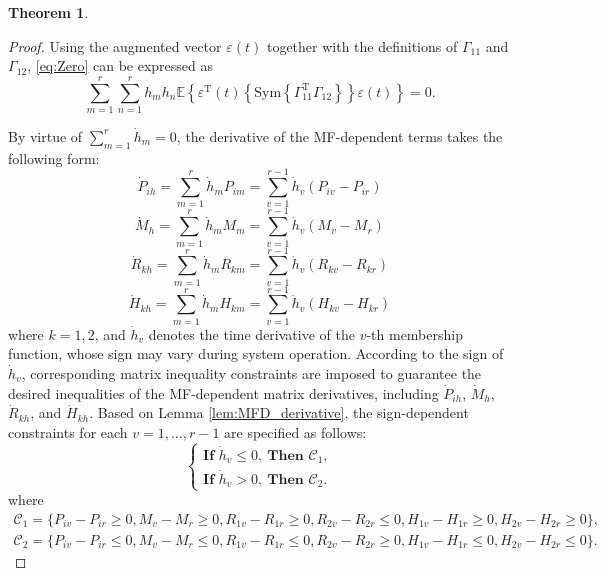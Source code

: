\documentclass[preprint,review,fleqn,sort&compress,3p]{elsarticle}
\theoremstyle{definition} %
\theoremstyle{definition}%
\newtheorem{thm}{Theorem}[section]
\begin{document}
\begin{thm}
\begin{proof}
			Using the augmented vector $\varepsilon(t)$ together with the definitions of $\Gamma_{11}$ and $\Gamma_{12}$, \eqref{eq:Zero} can be expressed as
			\begin{equation} \label{eq:compact_VEQ}
				\sum_{m=1}^{r} \sum_{n=1}^{r} h_m h_n
				\mathbb{E} \left\lbrace 
				\varepsilon^{\mathrm{T}}(t) 
				\left\lbrace 
				\mathrm{Sym} \left\{ 
				\Gamma_{11}^{\mathrm{T}} \Gamma_{12}
				\right\} 
				\right\rbrace 
				\varepsilon(t)
				\right\rbrace 
				= 0.
			\end{equation}
			
			By virtue of $\sum_{m=1}^{r}\dot{h}_m=0$, the derivative of the MF-dependent terms takes the following form:
			\begin{equation}
				\dot{P}_{ih} = \sum_{m=1}^{r} \dot{h}_m P_{im} = \sum_{v=1}^{r-1} \dot{h}_v (P_{iv} - P_{ir})
			\end{equation}
			\begin{equation}
				\dot{M}_{h} = \sum_{m=1}^{r} \dot{h}_m M_{m} = \sum_{v=1}^{r-1} \dot{h}_v (M_{v} - M_{r})
			\end{equation}
			\begin{equation}
				\dot{R}_{kh} = \sum_{m=1}^{r} \dot{h}_m R_{km} = \sum_{v=1}^{r-1} \dot{h}_v (R_{kv} - R_{kr})
			\end{equation}
			\begin{equation}
				\dot{H}_{kh} = \sum_{m=1}^{r} \dot{h}_m H_{km} = \sum_{v=1}^{r-1} \dot{h}_v (H_{kv} - H_{kr})
			\end{equation}
			where $k = 1, 2$, and $\dot{h}_v$ denotes the time derivative of the $v$-th membership function, whose sign may vary during system operation. According to the sign of $\dot{h}_v$, corresponding matrix inequality constraints are imposed to guarantee the desired inequalities of the MF-dependent matrix derivatives, including $\dot P_{ih}$, $\dot M_h$, $\dot R_{kh}$, and $\dot H_{kh}$. Based on Lemma \ref{lem:MFD_derivative}, the sign-dependent constraints for each $v=1,\ldots,r-1$ are specified as follows:
			\begin{equation}
				\begin{cases}
					\textbf{If } \dot{h}_v \le 0,\ \textbf{Then } \mathcal{C}_1, \\[6pt]
					\textbf{If } \dot{h}_v > 0,\ \textbf{Then } \mathcal{C}_2.
				\end{cases}
			\end{equation}
			where 
			\begin{align*}
				\mathcal{C}_1=\{P_{iv}-P_{ir} \ge 0, M_{v}-M_{r} \ge 0, 
				R_{1v}-R_{1r} \ge 0,
				R_{2v}-R_{2r} \leq 0,
				H_{1v}-H_{1r} \ge 0, 
				H_{2v}-H_{2r} \ge  0\},
			\end{align*}
			\begin{align*}
				\mathcal{C}_2=\{P_{iv}-P_{ir} \le 0, M_{v}-M_{r} \le 0, 
				R_{1v}-R_{1r} \le 0, 
				R_{2v}-R_{2r} \ge 0, 
				H_{1v}-H_{1r} \le 0, 
				H_{2v}-H_{2r} \le 0\}.
			\end{align*}
			

\end{proof}
\end{thm}
\end{document}
